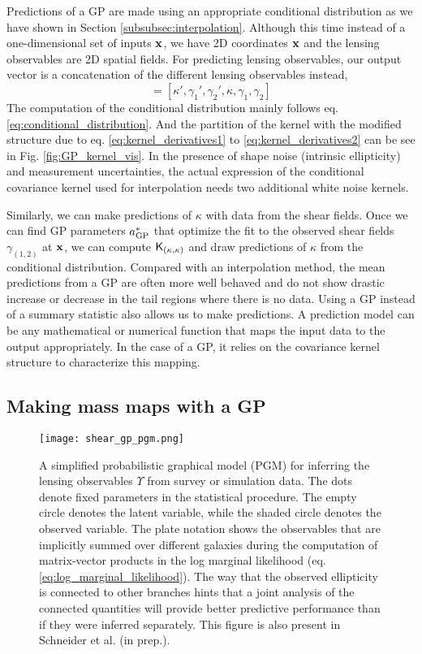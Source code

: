 Predictions of a GP are made using an appropriate conditional distribution as we have
shown in Section \ref{subsubsec:interpolation}. Although this time instead of a
one-dimensional set of inputs $\mathbf{x}$, we have 2D coordinates $\mathbf{x}$ and the
lensing observables are 2D spatial fields.
For predicting lensing observables, our output vector is a concatenation of the
different lensing observables instead, 
\begin{equation}
[\lensparams', \lensparams]  = [\kappa', \gamma_1', \gamma_2', \kappa,
\gamma_1, \gamma_2] 
\end{equation}
The computation of the
conditional distribution mainly follows eq. \ref{eq:conditional_distribution}.
And the partition of the kernel with the modified structure due to eq.
\ref{eq:kernel_derivatives1} to \ref{eq:kernel_derivatives2}
can be see in Fig. \ref{fig:GP_kernel_vis}.
In the presence of shape noise (intrinsic ellipticity) and measurement uncertainties, the actual 
expression of the conditional covariance kernel used for interpolation  
needs two additional white noise kernels.  

Similarly, we can make predictions of $\kappa$ with data from the shear fields. 
Once we can find GP parameters $a_{\rm GP}^*$ that optimize the fit to
the observed shear fields $\gamma_{(1, 2)}$ at $\mathbf{x}$, we can compute $\mathsf{K}_{(\kappa,
\kappa)}$ and draw predictions of $\kappa$ from the conditional distribution. 
Compared with an interpolation method, the mean predictions from a GP are
often more well behaved and do not show drastic increase or decrease 
in the tail regions where there is no data. 
%
Using a GP instead of a summary statistic also allows us to make predictions. 
A prediction model can be any mathematical or numerical function that maps 
the input data to the output appropriately. In the case of a GP, it relies on the covariance
kernel structure to characterize this mapping.  

\subsection{Making mass maps with a GP}
\begin{figure}
	\centering
	\texttt{[image: shear\_gp\_pgm.png]}
	\caption{A simplified probabilistic graphical model (PGM) for inferring
		the lensing observables $\Upsilon$ from survey or simulation data. The dots
		denote fixed parameters in the statistical procedure. The empty circle denotes
		the latent variable, while the shaded circle denotes 
		the observed variable. The plate notation shows the observables that are
		implicitly summed over different galaxies during the computation of matrix-vector
		products in the log marginal likelihood (eq. \ref{eq:log_marginal_likelihood}). The way that the observed
		ellipticity is connected to other branches hints that a joint analysis of
		the connected quantities will provide better predictive performance than if
		they were inferred separately. This figure is also present in Schneider et
		al. (in prep.).
		\label{fig:simplified_pgm}}
\end{figure}

